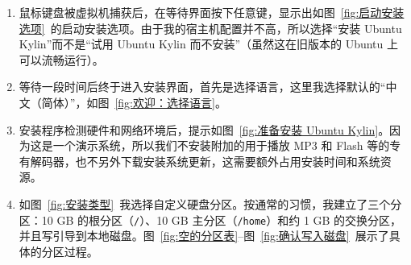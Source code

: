 \documentclass[cs4size,a4paper,nofonts]{ctexart}
\begin{document}
\begin{enumerate}
\item 鼠标键盘被虚拟机捕获后，在等待界面按下任意键，显示出如图~\ref{fig:启动安装选项}~的启动安装选项。由于我的宿主机配置并不高，所以选择“安装 Ubuntu Kylin”而不是“试用 Ubuntu Kylin 而不安装”（虽然这在旧版本的 Ubuntu 上可以流畅运行）。

\begin{figure}[htp]
\end{figure}

\item 等待一段时间后终于进入安装界面，首先是选择语言，这里我选择默认的“中文（简体）”，如图~\ref{fig:欢迎：选择语言}。

\item 安装程序检测硬件和网络环境后，提示如图~\ref{fig:准备安装 Ubuntu Kylin}。因为这是一个演示系统，所以我们不安装附加的用于播放 MP3 和 Flash 等的专有解码器，也不另外下载安装系统更新，这需要额外占用安装时间和系统资源。

\begin{figure}[htp]
\end{figure}

\item 如图~\ref{fig:安装类型}~我选择自定义硬盘分区。按通常的习惯，我建立了三个分区：10 GB 的根分区（\verb|/|）、10 GB 主分区（\verb|/home|）和约 1 GB 的交换分区，并且写引导到本地磁盘。图~\ref{fig:空的分区表}--图~\ref{fig:确认写入磁盘}~展示了具体的分区过程。

\begin{figure}[htp]
\end{figure}

\begin{figure}[htp]
\end{figure}

\begin{figure}[htp]
\end{figure}

\begin{figure}[htp]
\end{figure}


\end{enumerate}
\end{document}
